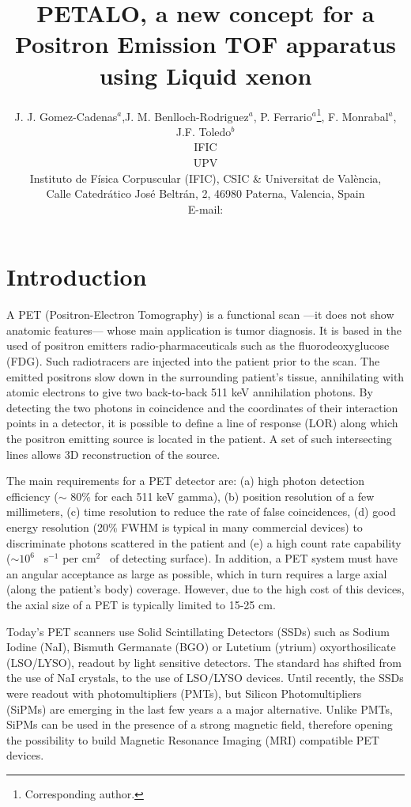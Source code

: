 \documentclass{JINST}
\title{PETALO, a new concept for a Positron Emission TOF apparatus using Liquid xenon}
\author{J. J. Gomez-Cadenas$^a$,J. M. Benlloch-Rodriguez$^a$, P. Ferrario$^a$\thanks{Corresponding author.}, 
F. Monrabal$^a$, J.F. Toledo$^b$

\llap{$^a$}IFIC\\
\llap{$^b$}UPV\\
\llap{$^b$}Instituto de F\'isica Corpuscular (IFIC), CSIC \& Universitat de Val\`encia,\\ 
Calle Catedr\'atico Jos\'e Beltr\'an, 2, 46980 Paterna, Valencia, Spain\\

E-mail: \email{gomez@mail.cern.ch}}
\begin{document}
\section{Introduction}

\label{sec.intro}

A PET (Positron-Electron Tomography) is a functional scan ---it does not show anatomic features--- whose main application is tumor diagnosis. It is based in the used of positron emitters radio-pharmaceuticals such as the fluorodeoxyglucose (FDG). Such radiotracers 
are injected into the patient prior to the scan. The emitted positrons slow down in the surrounding patient's tissue, annihilating with atomic electrons to give two back-to-back 511 keV annihilation photons.  By detecting the two photons in coincidence and the coordinates of their interaction points in a detector, it is possible to define a line of response (LOR) along which the positron emitting source is located in the patient. A set of such intersecting lines allows 3D reconstruction of the source. 

The main requirements for a PET detector are: (a) high photon detection efficiency ($\sim$ 80\% for each 511 keV gamma), (b) position resolution of a few millimeters, (c) time resolution to reduce the rate of false coincidences, (d) good energy resolution (20\% FWHM is typical in many commercial devices) to discriminate photons scattered in the patient and (e) a high count rate capability ($\sim10^6$~ s$^{-1}$ per cm$^2$~ of detecting surface). In addition, a PET system must have an angular acceptance as large as possible, which in turn requires a large axial (along the patient's body) coverage. However, due to the high cost of this devices, the axial size  of a PET is typically limited to 15-25 cm. 

Today's PET scanners use Solid Scintillating Detectors (SSDs) such as Sodium Iodine (NaI), Bismuth Germanate (BGO) or Lutetium (ytrium) oxyorthosilicate (LSO/LYSO), readout by light sensitive detectors. The standard has shifted from the use of NaI crystals, to the use of LSO/LYSO devices. Until recently, the SSDs were readout with photomultipliers (PMTs), but  Silicon Photomultipliers (SiPMs) are emerging in the last few years a a major alternative. Unlike PMTs, SiPMs can be used in the presence of a strong magnetic field, therefore opening the possibility to build Magnetic Resonance Imaging (MRI) compatible PET devices. 
\end{document}

